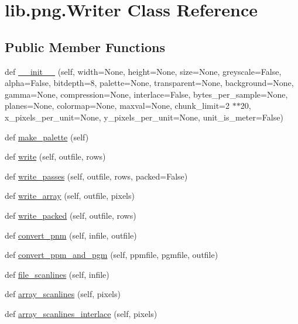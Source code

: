 \hypertarget{classlib_1_1png_1_1_writer}{}\section{lib.\+png.\+Writer Class Reference}
\label{classlib_1_1png_1_1_writer}
\subsection*{Public Member Functions}
\begin{DoxyCompactItemize}
\item 
def \hyperlink{classlib_1_1png_1_1_writer_a28a09bbc70676c1ba0ab623f207372e9}{\+\_\+\+\_\+init\+\_\+\+\_\+} (self, width=None, height=None, size=None, greyscale=False, alpha=False, bitdepth=8, palette=None, transparent=None, background=None, gamma=None, compression=None, interlace=False, bytes\+\_\+per\+\_\+sample=None, planes=None, colormap=None, maxval=None, chunk\+\_\+limit=2 $\ast$$\ast$20, x\+\_\+pixels\+\_\+per\+\_\+unit=None, y\+\_\+pixels\+\_\+per\+\_\+unit=None, unit\+\_\+is\+\_\+meter=False)
\item 
def \hyperlink{classlib_1_1png_1_1_writer_a011e08b5ac4df1948bf7ff7a2c634490}{make\+\_\+palette} (self)
\item 
def \hyperlink{classlib_1_1png_1_1_writer_a836164ca6ef355bd473162afa9811607}{write} (self, outfile, rows)
\item 
def \hyperlink{classlib_1_1png_1_1_writer_a6826050647c055bb388782a46f5fc08f}{write\+\_\+passes} (self, outfile, rows, packed=False)
\item 
def \hyperlink{classlib_1_1png_1_1_writer_a9d00f4d4809f82d0b6d52152579aedff}{write\+\_\+array} (self, outfile, pixels)
\item 
def \hyperlink{classlib_1_1png_1_1_writer_a7b00c3f8eebb81a53ab89aa17150012d}{write\+\_\+packed} (self, outfile, rows)
\item 
def \hyperlink{classlib_1_1png_1_1_writer_a4d9ce06af9b7bf52009dc7a2a9f13f37}{convert\+\_\+pnm} (self, infile, outfile)
\item 
def \hyperlink{classlib_1_1png_1_1_writer_a2eb6764944859e75490ac1a2c9e6659a}{convert\+\_\+ppm\+\_\+and\+\_\+pgm} (self, ppmfile, pgmfile, outfile)
\item 
def \hyperlink{classlib_1_1png_1_1_writer_af3ab4c859006ffd1a0e6abd49e5212c6}{file\+\_\+scanlines} (self, infile)
\item 
def \hyperlink{classlib_1_1png_1_1_writer_ad30399faaa028e3ea5f4e3eb19b235c5}{array\+\_\+scanlines} (self, pixels)
\item 
def \hyperlink{classlib_1_1png_1_1_writer_a1490da1ba99a6e8d773fcc424ed6319b}{array\+\_\+scanlines\+\_\+interlace} (self, pixels)
\end{DoxyCompactItemize}
